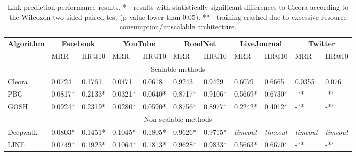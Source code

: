 \documentclass{IEEEtran}
\begin{document}
 
 
 \begin{table*}
\centering

\begin{tabular}{l|ll|ll|ll|ll|ll}
 \multirow{2}{1mm}{\textbf{Algorithm}} & 
 \multicolumn{2}{c}{\textbf{Facebook}} & 
 \multicolumn{2}{c}{\textbf{YouTube}}  &
 \multicolumn{2}{c}{\textbf{RoadNet}}  & 
 \multicolumn{2}{c}{\textbf{LiveJournal}} &
 \multicolumn{2}{c}{\textbf{Twitter}} 
 \\

  & MRR & HR@10 & MRR & HR@10 & MRR & HR@10 & MRR & HR@10 & MRR & HR@10 \\\hline
  
   \multicolumn{11}{c}{Scalable methods} \\
   \hline
  

Cleora & 0.0724 & 0.1761 & 0.0471 & 0.0618 & 0.9243 & 0.9429 & 0.6079 & 0.6665 & 0.0355 & 0.076 \\
 PBG \cite{pbg} & 0.0817* & 0.2133* & 0.0321* & 0.0640* & 0.8717* & 0.9106* &  0.5669* & 0.6730*  & -** & -** \\
 GOSH \cite{10.1145/3404397.3404456} &  0.0924* & 0.2319* & 0.0280* & 0.0590* & 0.8756* & 0.8977* & 0.2242* & 0.4012*  & -** & -** \\
\hline
   \multicolumn{11}{c}{Non-scalable methods} \\
   \hline
 Deepwalk \cite{perozzi2014deepwalk} & 0.0803* & 0.1451* & 0.1045* & 0.1805* & 0.9626* & 0.9715* & \textit{timeout} & \textit{timeout} & \textit{timeout} & \textit{timeout} \\ 
 LINE \cite{tang2015line} & 0.0749* & 0.1923* & 0.1064* & 0.1813* & 0.9628* & 0.9833* & 0.5663* & 0.6670* & -** & -**\\
 \hline
\end{tabular}
\caption{Link prediction performance results. * - results with statistically significant differences to Cleora according to the Wilcoxon two-sided paired test (p-value lower than 0.05). ** - training crashed due to excessive resource consumption/unscalable architecture.}
\label{performance-lp}
\end{table*}
\end{document}
